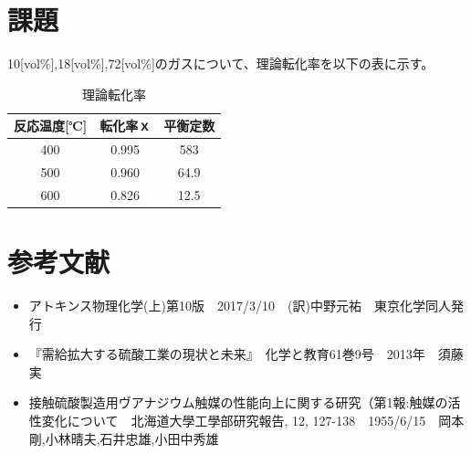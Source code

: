 \documentclass{ltjsarticle}
\begin{document}
\section{課題}
10[vol\%],18[vol\%],72[vol\%]のガスについて、理論転化率を以下の表に示す。

\begin{table}[htb]
    \caption{理論転化率}
    \begin{center}
        \begin{tabular}{|c|c|c|}\hline
            反応温度[℃] & 転化率ｘ & 平衡定数 \\  \hline\hline
            400         & 0.995    & 583      \\ \hline
            500         & 0.960    & 64.9     \\ \hline
            600         & 0.826    & 12.5     \\ \hline
        \end{tabular}
    \end{center}
\end{table}

\section{参考文献}
\begin{itemize}
    \item アトキンス物理化学(上)第10版　2017/3/10　(訳)中野元祐　東京化学同人発行
    \item 『需給拡大する硫酸工業の現状と未来』　化学と教育61巻9号　2013年　須藤実
    \item 接触硫酸製造用ヴアナジウム触媒の性能向上に関する研究（第1報:触媒の活性変化について　北海道大學工學部研究報告, 12, 127-138　1955/6/15　岡本剛,小林晴夫,石井忠雄,小田中秀雄
\end{itemize}
\end{document}
